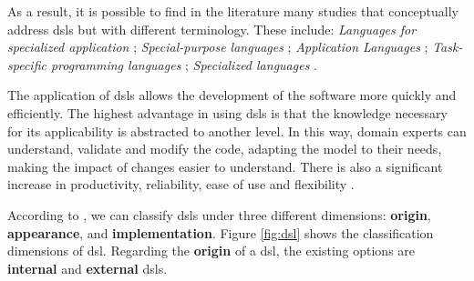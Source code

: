 As a result, it is possible to find in the literature many studies that conceptually address \acp{dsl} but with different terminology.
These include: \textit{Languages for specialized application} \cite{Sammet:1972}; \textit{Special-purpose languages} \cite{Wexelblat:1978}; \textit{Application Languages} \cite{Martin:1982}; \textit{Task-specific programming languages} \cite{Nardi:1993}; \textit{Specialized languages} \cite{Bergin:1996}.
    
The application of \acp{dsl} allows the development of the software more quickly and efficiently.
The highest advantage in using \acp{dsl} is that the knowledge necessary for its applicability is abstracted to another level.
In this way, domain experts can understand, validate and modify the code, adapting the model to their needs, making the impact of changes easier to understand.
There is also a significant increase in productivity, reliability, ease of use and flexibility \cite{Gronback:2009, vanDeursen:2000}.

According to \cite{Mernik:2005}, we can classify \acp{dsl} under three different dimensions: \textbf{origin}, \textbf{appearance}, and \textbf{implementation}.
Figure \ref{fig:dsl} shows the classification dimensions of \ac{dsl}.
Regarding the \textbf{origin} of a \ac{dsl}, the existing options are \textbf{internal} and \textbf{external} \acp{dsl}.

